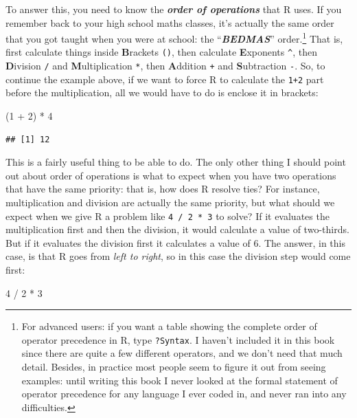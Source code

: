 \documentclass[
]{book}
\newenvironment{Shaded}{\begin{snugshade}}{\end{snugshade}}
\newcommand{\DecValTok}[1]{\textcolor[rgb]{0.00,0.00,0.81}{#1}}
\newcommand{\NormalTok}[1]{#1}
\newcommand{\SpecialCharTok}[1]{\textcolor[rgb]{0.00,0.00,0.00}{#1}}
\begin{document}
To answer this, you need to know the \textbf{\emph{order of operations}} that R uses. If you remember back to your high school maths classes, it's actually the same order that you got taught when you were at school: the ``\textbf{\emph{BEDMAS}}'' order.\footnote{For advanced users: if you want a table showing the complete order of operator precedence in R, type \texttt{?Syntax}. I haven't included it in this book since there are quite a few different operators, and we don't need that much detail. Besides, in practice most people seem to figure it out from seeing examples: until writing this book I never looked at the formal statement of operator precedence for any language I ever coded in, and never ran into any difficulties.} That is, first calculate things inside \textbf{B}rackets \texttt{()}, then calculate \textbf{E}xponents \texttt{\^{}}, then \textbf{D}ivision \texttt{/} and \textbf{M}ultiplication \texttt{*}, then \textbf{A}ddition \texttt{+} and \textbf{S}ubtraction \texttt{-}. So, to continue the example above, if we want to force R to calculate the \texttt{1+2} part before the multiplication, all we would have to do is enclose it in brackets:

\begin{Shaded}
\begin{Highlighting}[]
\NormalTok{(}\DecValTok{1} \SpecialCharTok{+} \DecValTok{2}\NormalTok{) }\SpecialCharTok{*} \DecValTok{4} 
\end{Highlighting}
\end{Shaded}

\begin{verbatim}
## [1] 12
\end{verbatim}

This is a fairly useful thing to be able to do. The only other thing I should point out about order of operations is what to expect when you have two operations that have the same priority: that is, how does R resolve ties? For instance, multiplication and division are actually the same priority, but what should we expect when we give R a problem like \texttt{4\ /\ 2\ *\ 3} to solve? If it evaluates the multiplication first and then the division, it would calculate a value of two-thirds. But if it evaluates the division first it calculates a value of 6. The answer, in this case, is that R goes from \emph{left to right}, so in this case the division step would come first:

\begin{Shaded}
\begin{Highlighting}[]
\DecValTok{4} \SpecialCharTok{/} \DecValTok{2} \SpecialCharTok{*} \DecValTok{3}
\end{Highlighting}
\end{Shaded}
\end{document}
